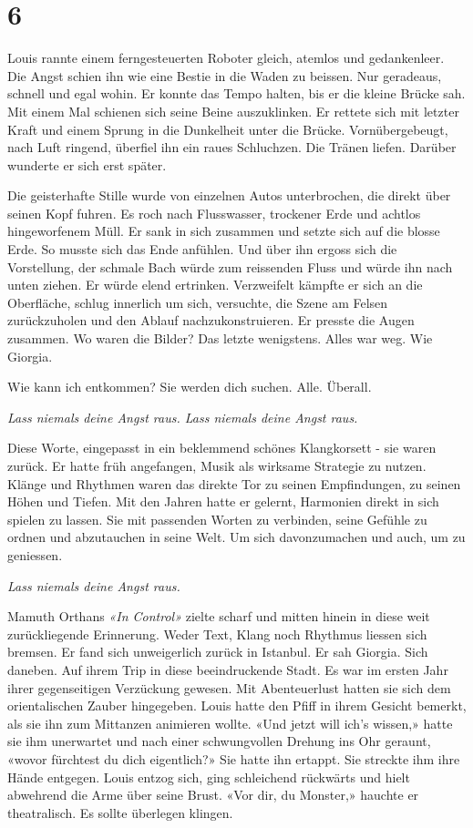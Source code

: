 \chapter{6}



Louis rannte einem ferngesteuerten Roboter gleich, atemlos und
gedankenleer. Die Angst schien ihn wie eine Bestie in die Waden zu
beissen. Nur geradeaus, schnell und egal wohin. Er konnte das Tempo
halten, bis er die kleine Brücke sah.
Mit einem Mal schienen sich seine Beine auszuklinken. Er rettete sich
mit letzter Kraft und einem Sprung in die Dunkelheit unter die Brücke.
Vornübergebeugt, nach Luft ringend, überfiel ihn ein raues Schluchzen.
Die Tränen liefen. Darüber wunderte er sich erst später.

Die geisterhafte Stille wurde von einzelnen Autos unterbrochen, die
direkt über seinen Kopf fuhren. Es roch nach Flusswasser,
trockener Erde und achtlos hingeworfenem Müll.
Er sank in sich zusammen und setzte sich auf die blosse Erde.
So musste sich das Ende anfühlen. Und über ihn ergoss sich die
Vorstellung, der schmale Bach würde zum reissenden Fluss und würde ihn nach unten ziehen. Er würde elend ertrinken. Verzweifelt
kämpfte er sich an die Oberfläche, schlug innerlich um sich, versuchte, 
die Szene am Felsen zurückzuholen und den Ablauf nachzukonstruieren. 
Er presste die Augen zusammen. Wo waren die Bilder? Das letzte wenigstens.
Alles war weg. Wie Giorgia.

Wie kann ich entkommen?
Sie werden dich suchen. Alle. Überall.

\sectionbreak

\emph{Lass niemals deine Angst raus. Lass niemals deine Angst raus.}

\sectionbreak

Diese Worte, eingepasst in ein beklemmend schönes 
Klangkorsett - sie waren zurück. Er hatte früh angefangen, Musik als wirksame Strategie zu nutzen. Klänge und
Rhythmen waren das direkte Tor zu seinen Empfindungen, zu seinen Höhen und
Tiefen. Mit den Jahren hatte er gelernt, Harmonien direkt in sich spielen zu lassen. Sie mit passenden Worten zu verbinden, seine Gefühle zu ordnen und abzutauchen in seine Welt. Um sich davonzumachen und auch, um zu geniessen. 

\emph{Lass niemals deine Angst raus.}

Mamuth Orthans \emph{«In Control»} zielte scharf und mitten hinein in diese weit zurückliegende
Erinnerung. Weder Text, Klang noch Rhythmus liessen sich bremsen. 
Er fand sich unweigerlich zurück in Istanbul. Er sah Giorgia. Sich daneben. Auf ihrem Trip in diese beeindruckende Stadt. Es war im ersten Jahr ihrer gegenseitigen Verzückung gewesen. Mit Abenteuerlust hatten sie sich dem orientalischen Zauber hingegeben.
Louis hatte den Pfiff in ihrem Gesicht bemerkt, als sie ihn zum Mittanzen animieren wollte.
«Und jetzt will ich’s wissen,» hatte sie ihm unerwartet und nach einer schwungvollen Drehung ins Ohr geraunt, «wovor fürchtest du dich
eigentlich?»
Sie hatte ihn ertappt. Sie streckte ihm ihre Hände entgegen. Louis entzog sich, ging schleichend rückwärts und hielt abwehrend die Arme
über seine Brust.
«Vor dir, du Monster,» hauchte er theatralisch. Es sollte überlegen klingen.


